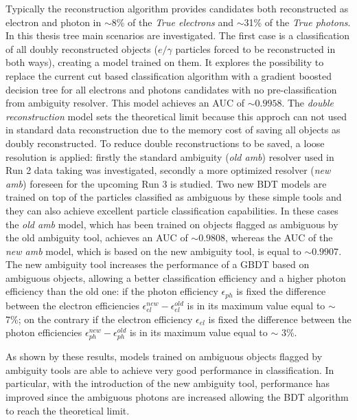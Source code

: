 \documentclass[a4paper, oneside, 11pt, openright]{book}
\begin{document}
		Typically the reconstruction algorithm provides candidates both reconstructed as electron and photon in $\sim$8\% of the \textit{True electrons} and $\sim$31\% of the \textit{True photons}. In this thesis tree main scenarios are investigated. The first case is a classification of all doubly reconstructed objects ($e/\gamma$ particles forced to be reconstructed in both ways), creating a model trained on them. It explores the possibility to replace the current cut based classification algorithm with a gradient boosted decision tree for all electrons and photons candidates with no pre-classification from ambiguity resolver. This model achieves an AUC of $\sim0.9958$. The \textit{double reconstruction} model sets the theoretical limit because this approch can not used in standard data reconstruction due to the memory cost of saving all objects as doubly reconstructed. To reduce double reconstructions to be saved, a loose resolution is applied: firstly the standard ambiguity (\textit{old amb}) resolver used in Run 2 data taking was investigated, secondly a more optimized resolver (\textit{new amb}) foreseen for the upcoming Run 3 is studied. Two new BDT models are trained on top of the particles classified as ambiguous by these simple tools and they can also achieve excellent particle classification capabilities. In these cases the \textit{old amb} model, which has been trained on objects flagged as ambiguous by the old ambiguity tool, achieves an AUC of $\sim0.9808$, whereas the AUC of the \textit{new amb} model, which is based on the new ambiguity tool, is equal to $\sim0.9907$. The new ambiguity tool increases the performance of a GBDT based on ambiguous objects, allowing a better classification efficiency and a higher photon efficiency than the old one: if the photon efficiency $\epsilon_{ph}$ is fixed the difference between the electron efficiencies $\epsilon_{el}^{new} - \epsilon_{el}^{old}$ is in its maximum value equal to $\sim$ 7\%; on the contrary if the electron efficiency $\epsilon_{el}$ is fixed the difference between the photon efficiencies $\epsilon_{ph}^{new} - \epsilon_{ph}^{old}$ is in its maximum value equal to $\sim$ 3\%.
		
		As shown by these results, models trained on ambiguous objects flagged by ambiguity tools are able to achieve very good performance in classification. In particular, with the introduction of the new ambiguity tool, performance has improved since the ambiguous photons are increased allowing the BDT algorithm to reach the theoretical limit.
	
\end{document}
